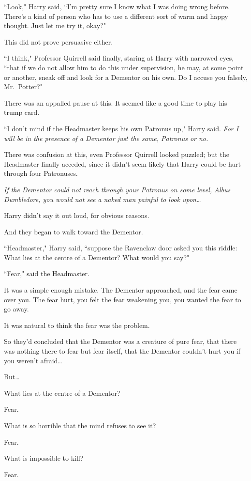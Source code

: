 ``Look," Harry said, ``I'm pretty sure I know what I was doing wrong before. There's a kind of person who has to use a different sort of warm and happy thought. Just let me try it, okay?"

This did not prove persuasive either.

``I think," Professor Quirrell said finally, staring at Harry with narrowed eyes, ``that if we do not allow him to do this under supervision, he may, at some point or another, sneak off and look for a Dementor on his own. Do I accuse you falsely, Mr.~Potter?"

There was an appalled pause at this. It seemed like a good time to play his trump card.

``I don't mind if the Headmaster keeps his own Patronus up," Harry said. \emph{For I will be in the presence of a Dementor just the same, Patronus or no.}

There was confusion at this, even Professor Quirrell looked puzzled; but the Headmaster finally acceded, since it didn't seem likely that Harry could be hurt through four Patronuses.

\emph{If the Dementor could not reach through your Patronus on some level, Albus Dumbledore, you would not see a naked man painful to look upon{\ldots}}

Harry didn't say it out loud, for obvious reasons.

And they began to walk toward the Dementor.

``Headmaster," Harry said, ``suppose the Ravenclaw door asked you this riddle: What lies at the centre of a Dementor? What would you say?"

``Fear," said the Headmaster.

It was a simple enough mistake. The Dementor approached, and the fear came over you. The fear hurt, you felt the fear weakening you, you wanted the fear to go away.

It was natural to think the fear was the problem.

So they'd concluded that the Dementor was a creature of pure fear, that there was nothing there to fear but fear itself, that the Dementor couldn't hurt you if you weren't afraid{\ldots}

But{\ldots}

\begin{em}
What lies at the centre of a Dementor?

Fear.

What is so horrible that the mind refuses to see it?

Fear.

What is impossible to kill?

Fear.
\end{em}

